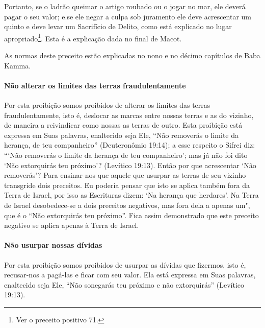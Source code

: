 Portanto, se o ladrão queimar o artigo roubado ou o jogar no mar, ele
deverá pagar o seu valor; e.se ele negar a culpa sob juramento ele deve
acrescentar um quinto e deve levar um Sacrifício de Delito, como está
explicado no lugar apropriado\footnote{Ver o preceito positivo 71.}. Esta é a explicação
dada no final de Macot.

As normas deste preceito estão explicadas no nono e no décimo capítulos de Baba Kamma.

\paragraph{Não alterar os limites das terras fraudulentamente}

Por esta proibição somos proibidos de alterar os limites das terras
fraudulentamente, isto é, deslocar as marcas entre nossas terras e as do
vizinho, de maneira a reivindicar como nossas as terras de outro. Esta
proibição está expressa em Suas palavras, enaltecido seja Ele, ``Não
removerás o limite da herança, de teu companheiro'' (Deuteronômio
19:14); a esse respeito o Sifrei diz: ```Não removerás o limite da
herança de teu companheiro'; mas já não foi dito `Não extorquirás teu
próximo'? (Levítico 19:13). Então por que acrescentar `Não removerás'?
Para ensinar-nos que aquele que usurpar as terras de seu vizinho
transgride dois preceitos. Eu poderia pensar que isto se aplica também
fora da Terra de Israel, por isso as Escrituras dizem: `Na herança que
herdares'. Na Terra de Israel desobedece-se a dois preceitos negativos,
mas fora dela a apenas um", que é o ``Não extorquirás teu próximo''.
Fica assim demonstrado que este preceito negativo se aplica apenas à
Terra de Israel.

\paragraph{Não usurpar nossas dívidas}

Por esta proibição somos proibidos de usurpar as dívidas que fizermos,
isto é, recusar-nos a pagá-las e ficar com seu valor. Ela está expressa
em Suas palavras, enaltecido seja Ele, ``Não sonegarás teu próximo e não
extorquirás'' (Levítico 19:13).

